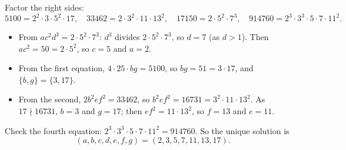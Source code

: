 Factor the right sides:
\[
5100=2^2\cdot3\cdot5^2\cdot17,\quad 33462=2\cdot3^2\cdot11\cdot13^2,\quad 17150=2\cdot5^2\cdot7^3,\quad 914760=2^3\cdot3^3\cdot5\cdot7\cdot11^2 .
\]
\begin{itemize}
\item From $ac^2d^3=2\cdot5^2\cdot7^3$: $d^3$ divides $2\cdot5^2\cdot7^3$, so $d=7$ (as $d>1$). Then $ac^2=50=2\cdot5^2$, so $c=5$ and $a=2$.
\item From the first equation, $4\cdot25\cdot bg=5100$, so $bg=51=3\cdot17$, and $\{b,g\}=\{3,17\}$.
\item From the second, $2b^2ef^2=33462$, so $b^2ef^2=16731=3^2\cdot11\cdot13^2$. As $17\nmid16731$, $b=3$ and $g=17$; then $ef^2=11\cdot13^2$, so $f=13$ and $e=11$.
\end{itemize}
Check the fourth equation: $2^3\cdot3^3\cdot5\cdot7\cdot11^2=914760$. So the unique solution is
\[
\boxed{(a,b,c,d,e,f,g)=(2,3,5,7,11,13,17)} .
\]
